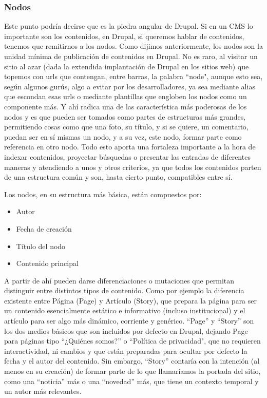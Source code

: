 \subsubsection{Nodos}

\par Este punto podría decirse que es la piedra angular de Drupal. Si en un CMS lo importante son los contenidos, en Drupal, si queremos hablar de contenidos, tenemos que remitirnos a los nodos. Como dijimos anteriormente, los nodos son la unidad mínima de publicación de contenidos en Drupal. No es raro, al visitar un sitio al azar (dada la extendida implantación de Drupal en los sitios web) que topemos con urls que contengan, entre barras, la palabra ``node", aunque esto sea, según algunos gurús, algo a evitar por los desarrolladores, ya sea mediante alias que escondan esas urls o mediante plantillas que engloben los nodos como un componente más.
Y ahí radica una de las característica más poderosas de los nodos y es que pueden ser tomados como partes de estructuras más grandes, permitiendo cosas como que una foto, su título, y si se quiere, un comentario, puedan ser en sí mismas un nodo, y a su vez, este nodo, formar parte como referencia en otro nodo.
Todo esto aporta una fortaleza importante a la hora de indexar contenidos, proyectar búsquedas o presentar las entradas de diferentes maneras y atendiendo a unos y otros criterios, ya que todos los contenidos parten de una estructura común y son, hasta cierto punto, compatibles entre sí.

\par Los nodos, en su estructura más básica, están compuestos por:
\begin{itemize}
\item Autor
\item Fecha de creación
\item Título del nodo
\item Contenido principal
\end{itemize}

\par A partir de ahí pueden darse diferenciaciones o mutaciones que permitan distinguir entre distintos tipos de contenido. Como por ejemplo la diferencia existente entre Página (Page) y Artículo (Story), que prepara la página para ser un contenido esencialmente estático e informativo (incluso institucional) y el artículo para ser algo más dinámico, corriente y genérico. ``Page'' y ``Story'' son los dos medios básicos que son incluidos por defecto en Drupal, dejando Page para páginas tipo ``¿Quiénes somos?'' o ``Política de privacidad", que no requieren interactividad, ni cambios y que están preparadas para ocultar por defecto la fecha y el autor del contenido. Sin embargo, ``Story'' contaría con la intención (al menos en su creación) de formar parte de lo que llamaríamos la portada del sitio, como una ``noticia'' más o una ``novedad'' más, que tiene un contexto temporal y un autor más relevantes.

